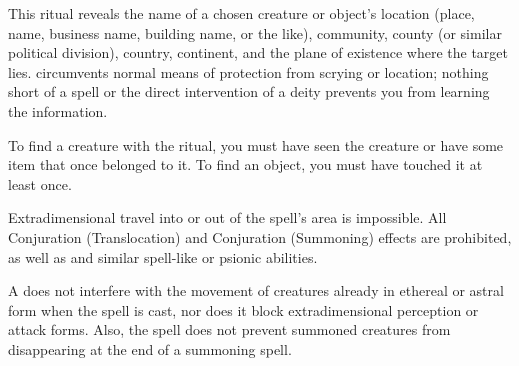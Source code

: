 \begin{spelleffect}
This ritual reveals the name of a chosen creature or object's location (place, name, business name, building name, or the like), community, county (or similar political division), country, continent, and the plane of existence where the target lies.  circumvents normal means of protection from scrying or location; nothing short of a  spell or the direct intervention of a deity prevents you from learning the information.
\par To find a creature with the ritual, you must have seen the creature or have some item that once belonged to it. To find an object, you must have touched it at least once.
\end{spelleffect}

\spellrng{\rngmed}
\begin{spelleffect}
Extradimensional travel into or out of the spell's area is impossible. All Conjuration (Translocation) and Conjuration (Summoning) effects are prohibited, as well as  and similar spell-like or psionic abilities.
\end{spelleffect}
\begin{spellnotes}
\par A  does not interfere with the movement of creatures already in ethereal or astral form when the spell is cast, nor does it block extradimensional perception or attack forms. Also, the spell does not prevent summoned creatures from disappearing at the end of a summoning spell.
\end{spellnotes}

